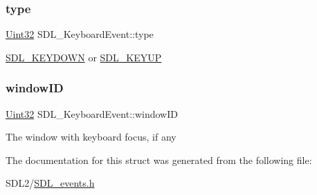\subsubsection{\texorpdfstring{type}{type}}
{\footnotesize\ttfamily \hyperlink{_s_d_l__stdinc_8h_add440eff171ea5f55cb00c4a9ab8672d}{Uint32} S\+D\+L\+\_\+\+Keyboard\+Event\+::type}

\hyperlink{_s_d_l__events_8h_a3b589e89be6b35c02e0dd34a55f3fccaacaf8cfd53c985cdbf6a90c811d51a1fc}{S\+D\+L\+\_\+\+K\+E\+Y\+D\+O\+WN} or \hyperlink{_s_d_l__events_8h_a3b589e89be6b35c02e0dd34a55f3fccaadefb8866b9d28be21c2c33c35cc66c4b}{S\+D\+L\+\_\+\+K\+E\+Y\+UP} \mbox{\label{struct_s_d_l___keyboard_event_a56efb6780b96acd5b50d8f797efb3546}} 
\subsubsection{\texorpdfstring{window\+ID}{windowID}}
{\footnotesize\ttfamily \hyperlink{_s_d_l__stdinc_8h_add440eff171ea5f55cb00c4a9ab8672d}{Uint32} S\+D\+L\+\_\+\+Keyboard\+Event\+::window\+ID}

The window with keyboard focus, if any 

The documentation for this struct was generated from the following file\+:\begin{DoxyCompactItemize}
\item 
S\+D\+L2/\hyperlink{_s_d_l__events_8h}{S\+D\+L\+\_\+events.\+h}\end{DoxyCompactItemize}
